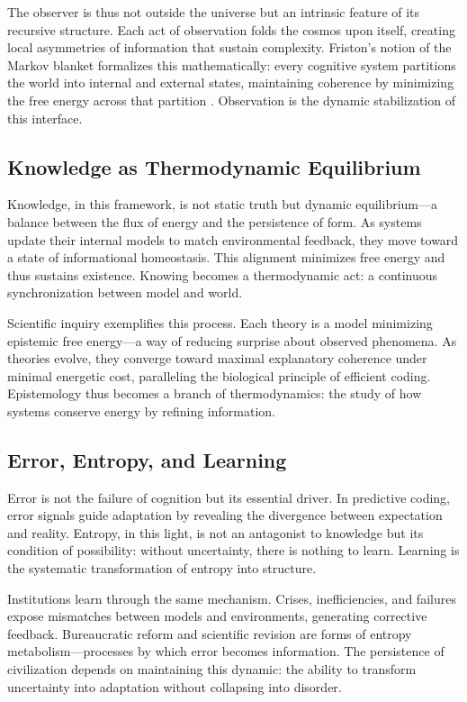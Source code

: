 \documentclass[11pt,a4paper]{article}
\begin{document}
The observer is thus not outside the universe but an intrinsic feature of its recursive structure.  Each act of observation folds the cosmos upon itself, creating local asymmetries of information that sustain complexity.  Friston’s notion of the Markov blanket formalizes this mathematically: every cognitive system partitions the world into internal and external states, maintaining coherence by minimizing the free energy across that partition \citep{Friston2010FreeEnergyPrinciple}.  Observation is the dynamic stabilization of this interface.

\subsection{Knowledge as Thermodynamic Equilibrium}

Knowledge, in this framework, is not static truth but dynamic equilibrium—a balance between the flux of energy and the persistence of form.  As systems update their internal models to match environmental feedback, they move toward a state of informational homeostasis.  This alignment minimizes free energy and thus sustains existence.  Knowing becomes a thermodynamic act: a continuous synchronization between model and world.

Scientific inquiry exemplifies this process.  Each theory is a model minimizing epistemic free energy—a way of reducing surprise about observed phenomena.  As theories evolve, they converge toward maximal explanatory coherence under minimal energetic cost, paralleling the biological principle of efficient coding.  Epistemology thus becomes a branch of thermodynamics: the study of how systems conserve energy by refining information.

\subsection{Error, Entropy, and Learning}

Error is not the failure of cognition but its essential driver.  In predictive coding, error signals guide adaptation by revealing the divergence between expectation and reality.  Entropy, in this light, is not an antagonist to knowledge but its condition of possibility: without uncertainty, there is nothing to learn.  Learning is the systematic transformation of entropy into structure.

Institutions learn through the same mechanism.  Crises, inefficiencies, and failures expose mismatches between models and environments, generating corrective feedback.  Bureaucratic reform and scientific revision are forms of entropy metabolism—processes by which error becomes information.  The persistence of civilization depends on maintaining this dynamic: the ability to transform uncertainty into adaptation without collapsing into disorder.
\end{document}
